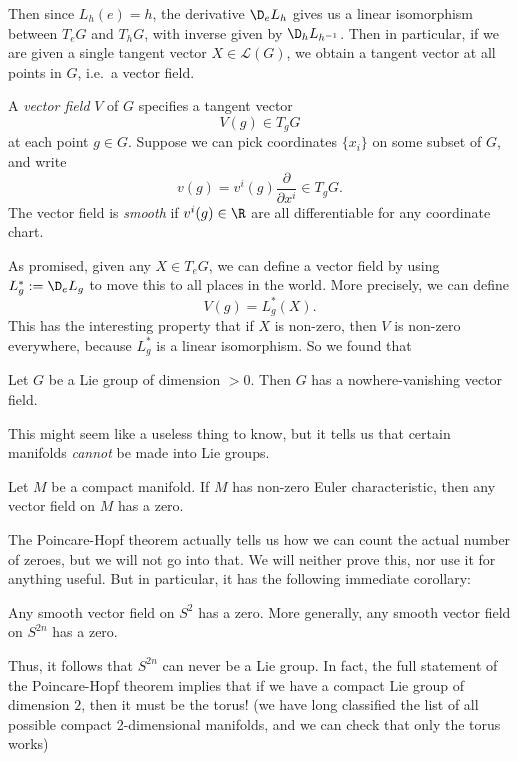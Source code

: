 \documentclass[a4paper]{article}
\begin{document}
Then since $L_h(e) = h$, the derivative $\D_e L_h$ gives us a linear isomorphism between $T_e G$ and $T_h G$, with inverse given by $\D_h L_{h^{-1}}$. Then in particular, if we are given a single tangent vector $X \in \mathcal{L}(G)$, we obtain a tangent vector at all points in $G$, i.e.\ a vector field.

\begin{defi}
  A \emph{vector field} $V$ of $G$ specifies a tangent vector
  \[
    V(g) \in T_gG
  \]
  at each point $g \in G$. Suppose we can pick coordinates $\{x_i\}$ on some subset of $G$, and write
  \[
    v(g) = v^i (g) \frac{\partial}{\partial x^i} \in T_g G.
  \]
  The vector field is \emph{smooth} if $v^i(g) \in \R$ are all differentiable for any coordinate chart.
\end{defi}

As promised, given any $X \in T_eG$, we can define a vector field by using $L_g^* := \D_e L_g$ to move this to all places in the world. More precisely, we can define
\[
  V(g) = L_g^*(X).
\]
This has the interesting property that if $X$ is non-zero, then $V$ is non-zero everywhere, because $L_g^*$ is a linear isomorphism. So we found that

\begin{prop}
  Let $G$ be a Lie group of dimension $> 0$. Then $G$ has a nowhere-vanishing vector field.
\end{prop}
This might seem like a useless thing to know, but it tells us that certain manifolds \emph{cannot} be made into Lie groups.

\begin{thm}
  Let $M$ be a compact manifold. If $M$ has non-zero Euler characteristic, then any vector field on $M$ has a zero.
\end{thm}
The Poincare-Hopf theorem actually tells us how we can count the actual number of zeroes, but we will not go into that. We will neither prove this, nor use it for anything useful. But in particular, it has the following immediate corollary:
\begin{thm}
  Any smooth vector field on $S^2$ has a zero. More generally, any smooth vector field on $S^{2n}$ has a zero.
\end{thm}
Thus, it follows that $S^{2n}$ can never be a Lie group. In fact, the full statement of the Poincare-Hopf theorem implies that if we have a compact Lie group of dimension $2$, then it must be the torus! (we have long classified the list of all possible compact 2-dimensional manifolds, and we can check that only the torus works)
\end{document}
